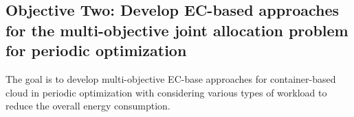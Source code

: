 \begin{enumerate}
\end{enumerate}
\subsection{Objective Two: Develop EC-based approaches for the multi-objective joint allocation problem for periodic optimization}
The goal is to develop multi-objective EC-base approaches for container-based cloud in periodic optimization with considering various types of workload to reduce the overall energy consumption.


